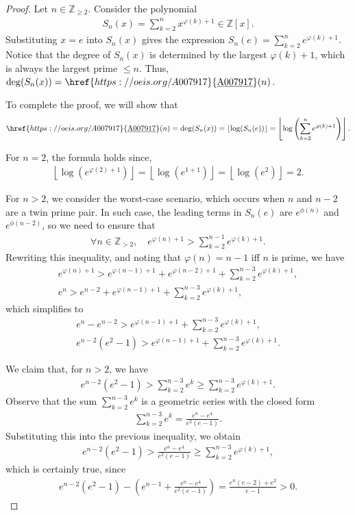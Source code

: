 \documentclass[10pt,a4paper]{article}
\theoremstyle{plain}
\newcommand{\floor}[1]{\left\lfloor #1 \right\rfloor}
\newcommand{\Z}{\mathbb{Z}}
\newcommand{\seqnum}[1]{\href{https://oeis.org/#1}{\rm \underline{#1}}}
\begin{document}
\begin{proof}
Let $n \in \Z_{\geq 2}$. Consider the polynomial
\begin{align*}
S_n(x) = \sum_{k=2}^n x^{\varphi(k)+1} \in \Z[x].
\end{align*}
Substituting $x = e$ into $S_n(x)$ gives the expression $S_n(e) = \sum_{k=2}^n e^{\varphi(k)+1}$. Notice that the degree of $S_n(x)$ is determined by the largest $\varphi(k) + 1$, which is always the largest prime $\leq n$. Thus, $\deg(S_n(x)) = \seqnum{A007917}(n)$.

To complete the proof, we will show that 
\begin{align*}
\seqnum{A007917}(n) = \deg(S_n(x)) = \floor{\log(S_n(e))} = \floor{ \log\left( \sum_{k=2}^n e^{\varphi(k)+1} \right) } .
\end{align*}

For $n=2$, the formula holds since,
\begin{align*}
    \floor{\log(e^{\varphi(2)+1})} = \floor{\log(e^{1+1})} = \floor{\log(e^2)} = 2 .
\end{align*}

For $n > 2$, we consider the worst-case scenario, which occurs when $n$ and $n-2$ are a twin prime pair. In such case, the leading terms in $S_n(e)$ are $e^{\phi(n)}$ and $e^{\phi(n-2)}$, so we need to ensure that
\begin{align*}
\forall n \in \Z_{>2}, \quad
e^{\varphi(n)+1} > \sum_{k=2}^{n-1} e^{\varphi(k)+1} .
\end{align*}
Rewriting this inequality, and noting that $\varphi(n) = n-1$ iff $n$ is prime, we have
\begin{align*}
e^{\varphi(n)+1} > e^{\varphi(n-1)+1} + e^{\varphi(n-2)+1} + \sum_{k=2}^{n-3} e^{\varphi(k)+1} , \\
e^n > e^{n-2} + e^{\varphi(n-1)+1} + \sum_{k=2}^{n-3} e^{\varphi(k)+1} ,
\end{align*}
which simplifies to
\begin{align*}
e^n - e^{n-2} > e^{\varphi(n-1)+1} + \sum_{k=2}^{n-3} e^{\varphi(k)+1} , \\
e^{n-2} (e^2-1) > e^{\varphi(n-1)+1} + \sum_{k=2}^{n-3} e^{\varphi(k)+1}.
\end{align*}

We claim that, for $n > 2$, we have
\begin{align*}
e^{n-2} (e^2-1) > \sum_{k=2}^{n-3} e^k \geq \sum_{k=2}^{n-3} e^{\varphi(k)+1}.
\end{align*}
Observe that the sum $\sum_{k=2}^{n-3} e^k$ is a geometric series with the closed form
\begin{align*}
\sum_{k=2}^{n-3} e^k = \frac{e^n-e^4}{e^2(e-1)} .
\end{align*}
Substituting this into the previous inequality, we obtain
\begin{align*}
e^{n-2} (e^2-1) > \frac{e^n-e^4}{e^2(e-1)} \geq \sum_{k=2}^{n-3} e^{\varphi(k)+1} ,
\end{align*}
which is certainly true, since
\begin{align*}
    e^{n-2} (e^2-1) - \left(e^{n-1} + \frac{e^n-e^4}{e^2(e-1)}\right) = \frac{e^n (e-2) + e^2}{e-1} > 0 .
\end{align*}


\end{proof}
\end{document}
